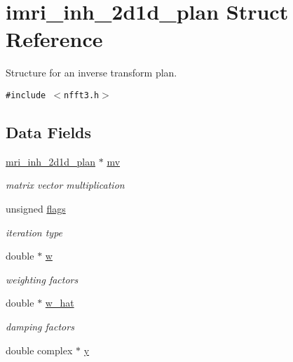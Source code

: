 \hypertarget{structimri__inh__2d1d__plan}{
\section{imri\_\-inh\_\-2d1d\_\-plan Struct Reference}
\label{structimri__inh__2d1d__plan}
}
Structure for an inverse transform plan.  


{\tt \#include $<$nfft3.h$>$}

\subsection*{Data Fields}
\begin{CompactItemize}
\item 
\hypertarget{structimri__inh__2d1d__plan_o0}{
\hyperlink{structmri__inh__2d1d__plan}{mri\_\-inh\_\-2d1d\_\-plan} $\ast$ \hyperlink{structimri__inh__2d1d__plan_o0}{mv}}
\label{structimri__inh__2d1d__plan_o0}

\begin{CompactList}\small\item\em matrix vector multiplication \item\end{CompactList}\item 
\hypertarget{structimri__inh__2d1d__plan_o1}{
unsigned \hyperlink{structimri__inh__2d1d__plan_o1}{flags}}
\label{structimri__inh__2d1d__plan_o1}

\begin{CompactList}\small\item\em iteration type \item\end{CompactList}\item 
\hypertarget{structimri__inh__2d1d__plan_o2}{
double $\ast$ \hyperlink{structimri__inh__2d1d__plan_o2}{w}}
\label{structimri__inh__2d1d__plan_o2}

\begin{CompactList}\small\item\em weighting factors \item\end{CompactList}\item 
\hypertarget{structimri__inh__2d1d__plan_o3}{
double $\ast$ \hyperlink{structimri__inh__2d1d__plan_o3}{w\_\-hat}}
\label{structimri__inh__2d1d__plan_o3}

\begin{CompactList}\small\item\em damping factors \item\end{CompactList}\item 
\hypertarget{structimri__inh__2d1d__plan_o4}{
double complex $\ast$ \hyperlink{structimri__inh__2d1d__plan_o4}{y}}
\label{structimri__inh__2d1d__plan_o4}


\end{CompactItemize}
